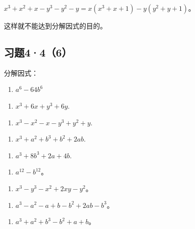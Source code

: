 \(x^{3} + x^{2} + x - y^{3} - y^{2} - y = x(x^{3} + x + 1) - y(y^{2} + y + 1)\)。

这样就不能达到分解因式的目的。

\subsection{习题4·4（6）}

分解因式：

\begin{enumerate}[start=1]
\item
  \(a^6 - 64b^6\)
\end{enumerate}

\begin{enumerate}[start=3]
\item
  \(x^{3} + 6x + y^{3} + 6y.\)
\end{enumerate}

\begin{enumerate}[start=5]
\item
  \(x^{3} - x^{2} - x - y^{3} + y^{2} + y.\)
\end{enumerate}

\begin{enumerate}[start=7]
\item
  \(x^{3} + a^{2} + b^{3} + b^{2} + 2ab.\)
\end{enumerate}

\begin{enumerate}[start=9]
\item
  \(a^3 + 8b^3 + 2a + 4b.\)
\end{enumerate}

\begin{enumerate}[start=2]
\item
  \(a^{12} - b^{12}\)。
\end{enumerate}

\begin{enumerate}[start=4]
\item
  \(x^{3} - y^{3} - x^{2} + 2xy - y^{2}\)。
\end{enumerate}

\begin{enumerate}[start=6]
\item
  \(a^3 - a^2 - a + b - b^2 + 2ab - b^3\)。
\end{enumerate}

\begin{enumerate}[start=8]
\item
  \(a^3 + a^2 + b^3 - b^2 + a + b\)。
\end{enumerate}

